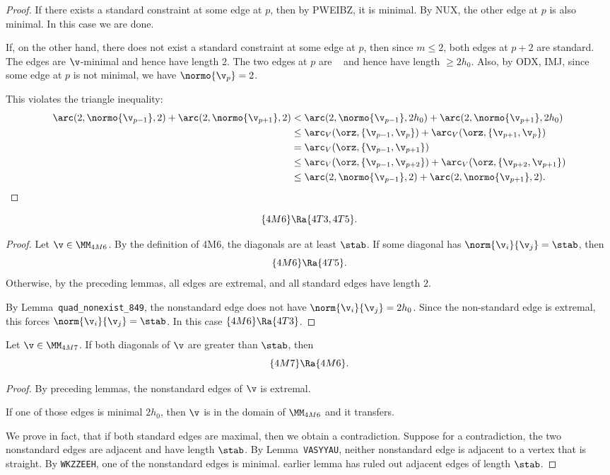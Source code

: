 \begin{proof}  If there exists a standard constraint at some edge at $p$, then by PWEIBZ, it is minimal.
By NUX, the other edge at $p$ is also minimal.  In this case we are done.

If, on the other hand, there does not exist a standard constraint at some edge at $p$, then since $m\le 2$,
both edges at $p+2$ are standard.  The edges are $\v$-minimal and hence have length $2$.
The two edges at $p$ are \prop~ and hence have length $\ge 2h_0$.  Also, by ODX, IMJ, since some
edge at $p$ is not minimal, we have $\normo{\v_p} = 2$.

This violates the triangle inequality:
\begin{align*}
\arc(2,\normo{\v_{p-1}},2) + \arc(2,\normo{\v_{p+1}},2) &<
  \arc(2,\normo{\v_{p-1}},2h_0) + \arc(2,\normo{\v_{p+1}},2h_0) \\
  &\le \arc_V(\orz,\{\v_{p-1},\v_p\} ) + \arc_V(\orz,\{\v_{p+1},\v_p\} ) \\
  &= \arc_V(\orz,\{\v_{p-1},\v_{p+1}\} ) \\
  &\le \arc_V(\orz,\{\v_{p-1},\v_{p+2}\} ) + \arc_V(\orz,\{\v_{p+2},\v_{p+1}\} ) \\
  &\le \arc(2,\normo{\v_{p-1}},2) + \arc(2,\normo{\v_{p+1}},2).
\end{align*}
\end{proof}

\begin{lemma}[]
\[
\{4M6\}\Ra \{4T3,4T5\}.
\]
\end{lemma}

\begin{proof} Let $\v\in \MM_{4M6}$.  By the definition of 4M6, the diagonals are at least $\stab$.
If some diagonal has $\norm{\v_i}{\v_j}=\stab$, then
\[
\{4M6\}\Ra\{4T5\}.
\]
Otherwise,
by the preceding lemmas, all edges are extremal, and
all standard edges have length $2$.
  
By Lemma~{\tt quad\_nonexist\_849}, the nonstandard edge does not have $\norm{\v_i}{\v_j}=2h_0$.
Since the non-standard edge is extremal, this forces $\norm{\v_i}{\v_j}=\stab$.
In this case $\{4M6\}\Ra \{4T3\}$.
\end{proof}

\begin{lemma}[]
Let $\v\in \MM_{4M7}$.  If both diagonals of $\v$ are greater than $\stab$, then
\[
\{4M7\}\Ra \{4M6\}.
\]
\end{lemma}

\begin{proof}
By preceding lemmas, the nonstandard edges of $\v$ is extremal.  


If one of those
edges is minimal $2h_0$, then $\v$ is in the domain of $\MM_{4M6}$ and it transfers.

We prove in fact, that if both standard edges are maximal, then we obtain a contradiction.
Suppose for a contradiction, the two nonstandard edges are adjacent and have length $\stab$.  
By Lemma~{\tt VASYYAU}, neither nonstandard edge is adjacent to a vertex that is straight.
By {\tt WKZZEEH},  one of the nonstandard edges is minimal.
earlier lemma has ruled out adjacent edges of length $\stab$.
\end{proof}

